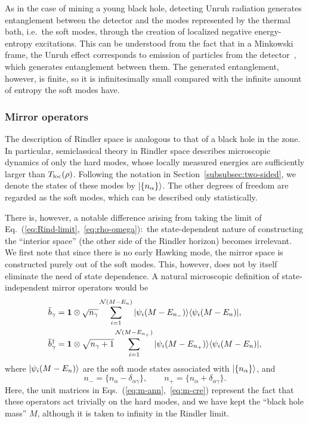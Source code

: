 \documentclass[12pt]{article}
\begin{document}
As in the case of mining a young black hole, detecting Unruh 
radiation generates entanglement between the detector and the modes 
represented by the thermal bath, i.e.\ the soft modes, through 
the creation of localized negative energy-entropy excitations. 
This can be understood from the fact that in a Minkowski frame, 
the Unruh effect corresponds to emission of particles from the 
detector~\cite{Unruh:1983ms}, which generates entanglement between 
them.  The generated entanglement, however, is finite, so it is 
infinitesimally small compared with the infinite amount of entropy 
the soft modes have.

\subsubsection{Mirror operators}
\label{subsubsec:mirror}

The description of Rindler space is analogous to that of a 
black hole in the zone.  In particular, semiclassical theory 
in Rindler space describes microscopic dynamics of only the 
hard modes, whose locally measured energies are sufficiently 
larger than $T_{\rm loc}(\rho)$.  Following the notation in 
Section~\ref{subsubsec:two-sided}, we denote the states of 
these modes by $| \{ n_\alpha \} \rangle$.  The other degrees of 
freedom are regarded as the soft modes, which can be described 
only statistically.

There is, however, a notable difference arising from taking the 
limit of Eq.~(\ref{eq:Rind-limit},~\ref{eq:rho-omega}):\ the 
state-dependent nature of constructing the ``interior space'' 
(the other side of the Rindler horizon) becomes irrelevant. 
We first note that since there is no early Hawking mode, the 
mirror space is constructed purely out of the soft modes.  This, 
however, does not by itself eliminate the need of state dependence. 
A natural microscopic definition of state-independent mirror 
operators would be
%
\begin{align}
  \tilde{b}_\gamma 
  &= {\bf 1} \otimes 
    \sqrt{n_\gamma} \sum_{i = 1}^{{\cal N}(M-E_n)} 
    \ket{\psi_i(M-E_{n_-})} \bra{\psi_i(M-E_n)},
\label{eq:m-ann}\\
  \tilde{b}_\gamma^\dagger 
  &= {\bf 1} \otimes 
    \sqrt{n_\gamma + 1} \sum_{i = 1}^{{\cal N}(M-E_{n_+})} 
    \ket{\psi_i(M-E_{n_+})} \bra{\psi_i(M-E_n)},
\label{eq:m-cre}
\end{align}
%
where $| \psi_i(M-E_n) \rangle$ are the soft mode states associated 
with $| \{ n_\alpha \} \rangle$, and
%
\begin{equation}
  n_- = \{ n_\alpha - \delta_{\alpha\gamma} \},
\qquad
  n_+ = \{ n_\alpha + \delta_{\alpha\gamma} \}.
\label{eq:n-_n+}
\end{equation}
%
Here, the unit matrices in Eqs.~(\ref{eq:m-ann},~\ref{eq:m-cre}) 
represent the fact that these operators act trivially on the hard 
modes, and we have kept the ``black hole mass'' $M$, although it 
is taken to infinity in the Rindler limit.
\end{document}

